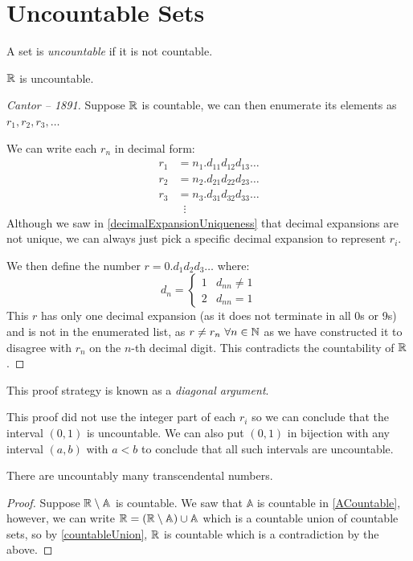 \documentclass[../main.tex]{subfiles}
\begin{document}
\section{Uncountable Sets}
\begin{definition}[Uncountable]
  A set is \textit{uncountable} if it is not countable.
\end{definition}
\begin{theorem}
  $\mathbb{R}$ is uncountable.
  \label{RUncountable}
\end{theorem}
\begin{proof}[Cantor -- 1891]
  Suppose $\mathbb{R}$ is countable, we can then enumerate its elements as $r_1, r_2, r_3, \ldots$

  We can write each $r_n$ in decimal form:
  \begin{align*}
    r_1 &= n_1.d_{1 1}d_{1 2}d_{1 3}\ldots \\
    r_2 &= n_2.d_{2 1}d_{2 2}d_{2 3}\ldots \\
    r_3 &= n_3.d_{3 1}d_{3 2}d_{3 3}\ldots \\
        &\;\;\vdots
  \end{align*}
  Although we saw in \cref{decimalExpansionUniqueness} that decimal expansions are not unique, we can always just pick a specific decimal expansion to represent $r_i$.

  We then define the number $r = 0.d_1d_2d_3\ldots$ where:
  \[
    d_n = \begin{cases}
    1 & d_{n n} \neq 1 \\
    2 & d_{n n} = 1
    \end{cases}
  \]
  This $r$ has only one decimal expansion (as it does not terminate in all 0s or 9s) and is not in the enumerated list, as $r \neq r_n\ \forall n \in \mathbb{N}$ as we have constructed it to disagree with $r_n$ on the $n$-th decimal digit.
  This contradicts the countability of $\mathbb{R}$.
\end{proof}
This proof strategy is known as a \textit{diagonal argument}.
\begin{remark}
  This proof did not use the integer part of each $r_i$ so we can conclude that the interval $(0, 1)$ is uncountable.
  We can also put $(0, 1)$ in bijection with any interval $(a, b)$ with $a < b$ to conclude that all such intervals are uncountable.
\end{remark}
\begin{corollary}
  There are uncountably many transcendental numbers.
\end{corollary}
\begin{proof}
  Suppose $\mathbb{R} \setminus \mathbb{A}$ is countable.
  We saw that $\mathbb{A}$ is countable in \cref{ACountable}, however, we can write $\mathbb{R} = (\mathbb{R} \setminus \mathbb{A}) \cup \mathbb{A}$ which is a countable union of countable sets, so by \cref{countableUnion}, $\mathbb{R}$ is countable which is a contradiction by the above.
\end{proof}
\end{document}
